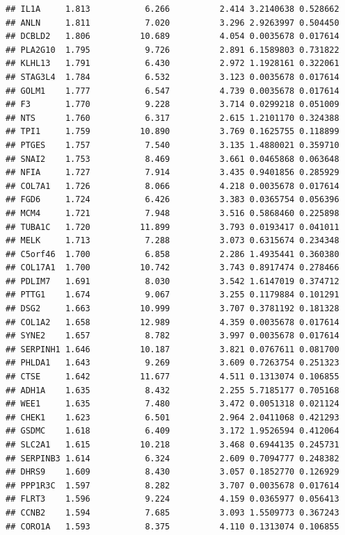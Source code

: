 \documentclass{article}\usepackage[]{graphicx}\usepackage[]{color}
\makeatletter
\newenvironment{kframe}{%
 \def\at@end@of@kframe{}%
 \ifinner\ifhmode%
  \def\at@end@of@kframe{\end{minipage}}%
  \begin{minipage}{\columnwidth}%
 \fi\fi%
 \def\FrameCommand##1{\hskip\@totalleftmargin \hskip-\fboxsep
 \colorbox{shadecolor}{##1}\hskip-\fboxsep
     \hskip-\linewidth \hskip-\@totalleftmargin \hskip\columnwidth}%
 \MakeFramed {\advance\hsize-\width
   \@totalleftmargin\z@ \linewidth\hsize
   \@setminipage}}%
 {\par\unskip\endMakeFramed%
 \at@end@of@kframe}
\newenvironment{knitrout}{}{} %
\makeatother
\begin{document}
\begin{knitrout}
\begin{kframe}
\begin{verbatim}
## IL1A     1.813           6.266          2.414 3.2140638 0.528662
## ANLN     1.811           7.020          3.296 2.9263997 0.504450
## DCBLD2   1.806          10.689          4.054 0.0035678 0.017614
## PLA2G10  1.795           9.726          2.891 6.1589803 0.731822
## KLHL13   1.791           6.430          2.972 1.1928161 0.322061
## STAG3L4  1.784           6.532          3.123 0.0035678 0.017614
## GOLM1    1.777           6.547          4.739 0.0035678 0.017614
## F3       1.770           9.228          3.714 0.0299218 0.051009
## NTS      1.760           6.317          2.615 1.2101170 0.324388
## TPI1     1.759          10.890          3.769 0.1625755 0.118899
## PTGES    1.757           7.540          3.135 1.4880021 0.359710
## SNAI2    1.753           8.469          3.661 0.0465868 0.063648
## NFIA     1.727           7.914          3.435 0.9401856 0.285929
## COL7A1   1.726           8.066          4.218 0.0035678 0.017614
## FGD6     1.724           6.426          3.383 0.0365754 0.056396
## MCM4     1.721           7.948          3.516 0.5868460 0.225898
## TUBA1C   1.720          11.899          3.793 0.0193417 0.041011
## MELK     1.713           7.288          3.073 0.6315674 0.234348
## C5orf46  1.700           6.858          2.286 1.4935441 0.360380
## COL17A1  1.700          10.742          3.743 0.8917474 0.278466
## PDLIM7   1.691           8.030          3.542 1.6147019 0.374712
## PTTG1    1.674           9.067          3.255 0.1179884 0.101291
## DSG2     1.663          10.999          3.707 0.3781192 0.181328
## COL1A2   1.658          12.989          4.359 0.0035678 0.017614
## SYNE2    1.657           8.782          3.997 0.0035678 0.017614
## SERPINH1 1.646          10.187          3.821 0.0767611 0.081700
## PHLDA1   1.643           9.269          3.609 0.7263754 0.251323
## CTSE     1.642          11.677          4.511 0.1313074 0.106855
## ADH1A    1.635           8.432          2.255 5.7185177 0.705168
## WEE1     1.635           7.480          3.472 0.0051318 0.021124
## CHEK1    1.623           6.501          2.964 2.0411068 0.421293
## GSDMC    1.618           6.409          3.172 1.9526594 0.412064
## SLC2A1   1.615          10.218          3.468 0.6944135 0.245731
## SERPINB3 1.614           6.324          2.609 0.7094777 0.248382
## DHRS9    1.609           8.430          3.057 0.1852770 0.126929
## PPP1R3C  1.597           8.282          3.707 0.0035678 0.017614
## FLRT3    1.596           9.224          4.159 0.0365977 0.056413
## CCNB2    1.594           7.685          3.093 1.5509773 0.367243
## CORO1A   1.593           8.375          4.110 0.1313074 0.106855

\end{verbatim}
\end{kframe}
\end{knitrout}
\end{document}
